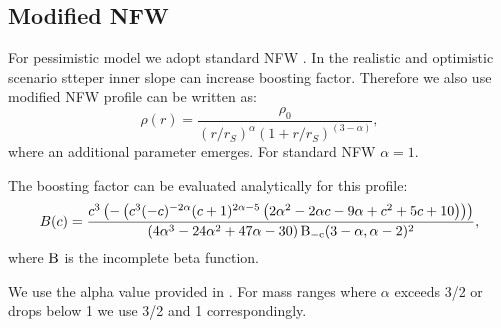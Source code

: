 \subsection{Modified NFW}

For pessimistic model we adopt standard NFW \cite{1997ApJ...490..493N}. In the realistic and optimistic scenario stteper inner slope can increase boosting factor. Therefore we also use modified NFW profile can be written as:
\begin{equation}
\rho(r) = \dfrac{\rho_0}{(r/r_S)^\alpha(1+r/r_S)^{(3-\alpha)}},
\end{equation}
where an additional parameter \alpha emerges. For standard NFW $\alpha=1$.

The boosting factor can be evaluated analytically for this profile:
\begin{equation}
B(c) = \frac{c^3 \left(-\left(c^3 (-c)^{-2 \alpha} (c+1)^{2 \alpha-5} \left(2 \alpha^2-2 \alpha c-9 \alpha+c^2+5 c+10\right)\right)\right)}{\left(4 \alpha^3-24 \alpha^2+47 \alpha-30\right) \rm{B}_{-c}(3-\alpha,\alpha-2){}^2},
\end{equation}
where $\rm{B}$ is the incomplete beta function.

We use the alpha value provided in \cite{Ishiyama_2014}. For mass ranges where $\alpha$ exceeds 3/2 or drops below 1 we use 3/2 and 1 correspondingly.